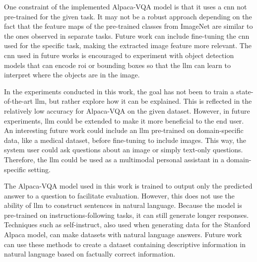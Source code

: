 
    One constraint of the implemented Alpaca-VQA model is that it uses a \gls{cnn} not pre-trained for the given task. It may not be a robust approach depending on the fact that the feature maps of the pre-trained classes from ImageNet are similar to the ones observed in separate tasks. 
    Future work can include fine-tuning the \gls{cnn} used for the specific task, making the extracted image feature more relevant. 
    The \gls{cnn} used in future works is encouraged to experiment with object detection models that can encode \gls{roi} or bounding boxes so that the \gls{llm} can learn to interpret where the objects are in the image.

    In the experiments conducted in this work, the goal has not been to train a state-of-the-art \gls{llm}, but rather explore how it can be explained. This is reflected in the relatively low accuracy for Alpaca-VQA on the given dataset.
    However, in future experiments, \gls{llm} could be extended to make it more beneficial to the end user.
    An interesting future work could include an \gls{llm} pre-trained on domain-specific data, like a medical dataset, before fine-tuning to include images. This way, the system user could ask questions about an image or simply text-only questions. Therefore, the \gls{llm} could be used as a multimodal personal assistant in a domain-specific setting. 

    The Alpaca-VQA model used in this work is trained to output only the predicted answer to a question to facilitate evaluation. However, this does not use the ability of \gls{llm} to construct sentences in natural language. Because the model is pre-trained on instructions-following tasks, it can still generate longer responses. Techniques such as self-instruct, also used when generating data for the Stanford Alpaca model, can make datasets with natural language answers. Future work can use these methods to create a dataset containing descriptive information in natural language based on factually correct information. 

    

